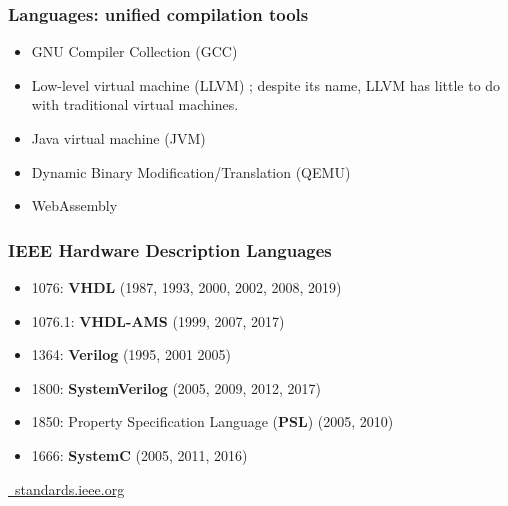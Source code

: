 \documentclass{beamer}
\begin{document}
\begin{frame}
\frametitle{Languages: unified compilation tools}
\begin{itemize}
\item GNU Compiler Collection (GCC) \href{https://gcc.gnu.org/}{\faGlobe}
\item Low-level virtual machine (LLVM) \href{https://llvm.org/}{\faGlobe}; {\footnotesize despite its name, LLVM has little to do with traditional virtual machines.}
\end{itemize}
\vspace{1.5em}
\begin{itemize}
\item Java virtual machine (JVM) \href{https://en.wikipedia.org/wiki/Java_virtual_machine}{\faWikipediaW}
\item Dynamic Binary Modification/Translation (QEMU) \href{https://www.qemu.org/}{\faGlobe}
\item WebAssembly \href{https://webassembly.org/}{\faGlobe} \href{https://en.wikipedia.org/wiki/WebAssembly}{\faWikipediaW}
\end{itemize}
\end{frame}

\begin{frame}
\frametitle{IEEE Hardware Description Languages}
\vfill
\begin{itemize}
\item 1076: \textbf{VHDL} (1987, 1993, 2000, 2002, 2008, 2019)
\item 1076.1: \textbf{VHDL-AMS} (1999, 2007, 2017)
\item 1364: \textbf{Verilog} (1995, 2001 2005)
\item 1800: \textbf{SystemVerilog} (2005, 2009, 2012, 2017)
\item 1850: Property Specification Language (\textbf{PSL}) (2005, 2010)
\item 1666: \textbf{SystemC} (2005, 2011, 2016)
\end{itemize}
\vfill
\centering
\Large\href{https://standards.ieee.org}{\faGlobe~standards.ieee.org}
\end{frame}
\end{document}
